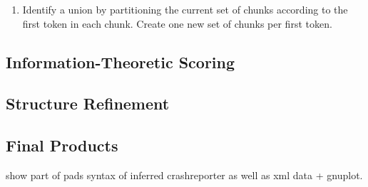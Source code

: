 \begin {enumerate}
\item Identify a union by partitioning the current set of chunks according
to the first token in each chunk.  Create one new set of chunks per first 
token.
\end{enumerate}


\subsection {Information-Theoretic Scoring}



\subsection {Structure Refinement}

%


 

\subsection {Final Products}

show part of pads syntax of inferred crashreporter as
well as xml data + gnuplot.
